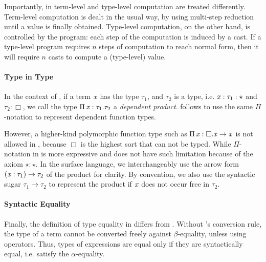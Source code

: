  

Importantly, in \ecore term-level and type-level computation are treated 
differently. Term-level computation is dealt in the usual way, by 
using multi-step reduction until a value is finally obtained. 
Type-level computation, on the other hand, is controlled by the program:
each step of the computation is induced by a cast. If a type-level 
program requires $n$ steps of computation to reach normal form, 
then it will require $n$ casts to compute a (type-level) value.

\paragraph{Type in Type}
 
In the context of \cc, if a term $\mathit{x}$ has the type $\tau_{{\mathrm{1}}}$, and
$\tau_{{\mathrm{2}}}$ is a type, i.e. $\mathit{x}:\tau_{{\mathrm{1}}}:\star$ and
$\tau_{{\mathrm{2}}}:\Box$, we call the type $\Pi \, \mathit{x}  :  \tau_{{\mathrm{1}}}  .  \tau_{{\mathrm{2}}}$ a
\emph{dependent product}. \ecore follows \cc to use the same
$ \Pi $-notation to represent dependent function types.

However, a higher-kind polymorphic function type such as $\Pi \, \mathit{x}  :  \Box  .  \mathit{x}  \rightarrow  \mathit{x}$ is not allowed in \cc, because $\Box$ is
the highest sort that can not be typed. While $ \Pi $-notation in
\ecore is more expressive and does not have such limitation because of
the axiom $\star:\star$. In the surface language, we
interchangeably use the arrow form $(  \mathit{x}  :  \tau_{{\mathrm{1}}}  )  \rightarrow  \tau_{{\mathrm{2}}}$ of the product for
clarity. By convention, we also use the syntactic sugar $\tau_{{\mathrm{1}}}  \longrightarrow  \tau_{{\mathrm{2}}}$ to represent the product if $\mathit{x}$ does not occur free in
$\tau_{{\mathrm{2}}}$.

\paragraph{Syntactic Equality}
Finally, the definition of type equality in \ecore differs from
\cc. Without \cc's conversion rule, the type of a term cannot be
converted freely against $\beta$-equality, unless using \cast
operators. Thus, types of expressions are equal only if they are
syntactically equal, i.e. satisfy the $\alpha$-equality.

